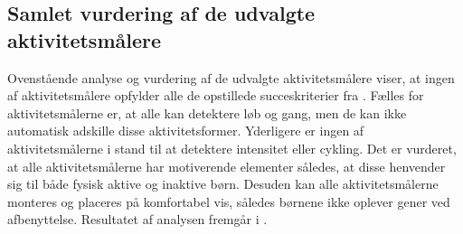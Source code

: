 \subsection{Samlet vurdering af de udvalgte aktivitetsmålere}
Ovenstående analyse og vurdering af de udvalgte aktivitetsmålere viser, at ingen af aktivitetsmålere opfylder alle de opstillede succeskriterier fra . \newline
Fælles for aktivitetsmålerne er, at alle kan detektere løb og gang, men de kan ikke automatisk adskille disse aktivitetsformer. Yderligere er ingen af aktivitetsmålerne i stand til at detektere intensitet eller cykling. Det er vurderet, at alle aktivitetsmålerne har motiverende elementer således, at disse henvender sig til både fysisk aktive og inaktive børn. Desuden kan alle aktivitetsmålerne monteres og placeres på komfortabel vis, således børnene ikke oplever gener ved afbenyttelse. Resultatet af analysen fremgår i . %
